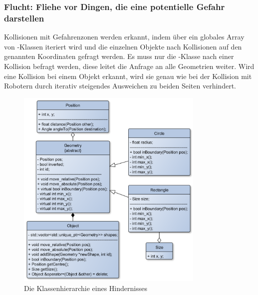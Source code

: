\subsubsection*{Flucht: Fliehe vor Dingen, die eine potentielle Gefahr darstellen}



Kollisionen mit Gefahrenzonen werden erkannt, indem über ein globales Array von -Klassen iteriert wird und die einzelnen Objekte nach Kollisionen auf den genannten Koordinaten gefragt werden. Es muss nur die -Klasse nach einer Kollision befragt werden, diese leitet die Anfrage an alle Geometrien weiter. Wird eine Kollision bei einem Objekt erkannt, wird sie genau wie bei der Kollision mit Robotern durch iterativ steigendes Ausweichen zu beiden Seiten verhindert.

\begin{figure}[h]
	\centering
	\includegraphics[width=0.8\textwidth,keepaspectratio]{graphics/Klassendiagramme/KlassendiagrammObject.png}
	\caption{Die Klassenhierarchie eines Hindernisses}
	\label{pic:KlassendiagramObjekt}
\end{figure}

